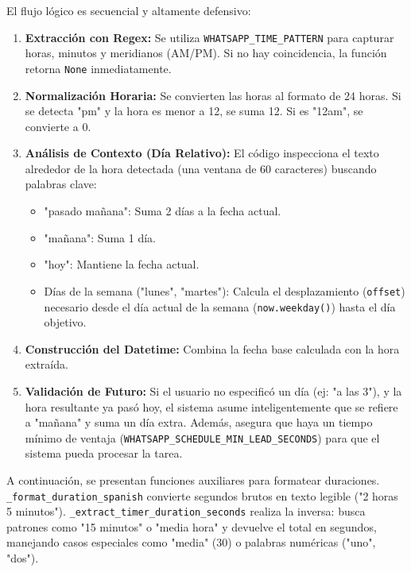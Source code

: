 \documentclass[letterpaper,12pt]{article}
\begin{document}
El flujo lógico es secuencial y altamente defensivo:
\begin{enumerate}
    \item \textbf{Extracción con Regex:} Se utiliza \texttt{WHATSAPP\_TIME\_PATTERN} para capturar horas, minutos y meridianos (AM/PM). Si no hay coincidencia, la función retorna \texttt{None} inmediatamente.
    \item \textbf{Normalización Horaria:} Se convierten las horas al formato de 24 horas. Si se detecta "pm" y la hora es menor a 12, se suma 12. Si es "12am", se convierte a 0.
    \item \textbf{Análisis de Contexto (Día Relativo):} El código inspecciona el texto alrededor de la hora detectada (una ventana de 60 caracteres) buscando palabras clave:
    \begin{itemize}
        \item "pasado mañana": Suma 2 días a la fecha actual.
        \item "mañana": Suma 1 día.
        \item "hoy": Mantiene la fecha actual.
        \item Días de la semana ("lunes", "martes"): Calcula el desplazamiento (\texttt{offset}) necesario desde el día actual de la semana (\texttt{now.weekday()}) hasta el día objetivo.
    \end{itemize}
    \item \textbf{Construcción del Datetime:} Combina la fecha base calculada con la hora extraída.
    \item \textbf{Validación de Futuro:} Si el usuario no especificó un día (ej: "a las 3"), y la hora resultante ya pasó hoy, el sistema asume inteligentemente que se refiere a "mañana" y suma un día extra. Además, asegura que haya un tiempo mínimo de ventaja (\texttt{WHATSAPP\_SCHEDULE\_MIN\_LEAD\_SECONDS}) para que el sistema pueda procesar la tarea.
\end{enumerate}

A continuación, se presentan funciones auxiliares para formatear duraciones. \texttt{\_format\_duration\_spanish} convierte segundos brutos en texto legible ("2 horas 5 minutos"). \texttt{\_extract\_timer\_duration\_seconds} realiza la inversa: busca patrones como "15 minutos" o "media hora" y devuelve el total en segundos, manejando casos especiales como "media" (30) o palabras numéricas ("uno", "dos").
\end{document}
